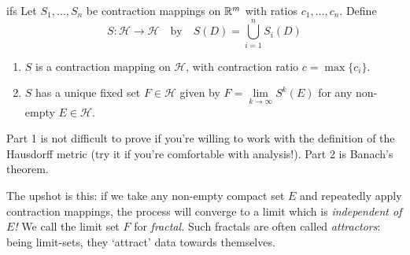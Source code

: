 \begin{thm}{}{ifs}
	Let $S_1,\ldots,S_n$ be contraction mappings on $\mathbb{R}^m$ with ratios $c_1,\ldots,c_n$. Define
	\[
		S:\mathcal H\to\mathcal H\quad\text{by}\quad S(D)=\bigcup_{i=1}^nS_i(D)
	\]
	\begin{enumerate}
	  \item $S$ is a contraction mapping on $\mathcal H$, with contraction ratio $c=\max\{c_i\}$.
	  \item $S$ has a unique fixed set $F\in\mathcal H$ given by $F=\lim\limits_{k\to\infty} S^k(E)$ for any non-empty $E\in\mathcal H$.
	\end{enumerate}
\end{thm}

Part 1 is not difficult to prove if you're willing to work with the definition of the Hausdorff metric (try it if you're comfortable with analysis!). Part 2 is Banach's theorem.\smallbreak

The upshot is this: if we take any non-empty compact set $E$ and repeatedly apply contraction mappings, the process will converge to a limit which is \emph{independent of $E$!} We call the limit set $F$ for \emph{fractal.} Such fractals are often called \emph{attractors}: being limit-sets, they `attract' data towards themselves.

\goodbreak


